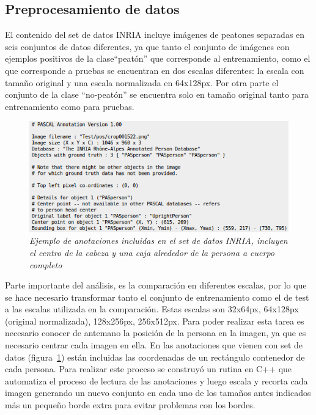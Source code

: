 \subsection{Preprocesamiento de datos}

El contenido del set de datos INRIA incluye imágenes de peatones separadas en seis conjuntos de datos diferentes, ya que tanto el conjunto de imágenes con ejemplos positivos de la clase``peatón'' que corresponde al entrenamiento, como el que corresponde a pruebas se encuentran en dos escalas diferentes: la escala con tamaño original y una escala normalizada en 64x128px. Por otra parte el conjunto de la clase ``no-peatón'' se encuentra solo en tamaño original tanto para entrenamiento como para pruebas. 

\begin{figure}[htc]
  \centering
  \includegraphics[scale=.6]{images/ejanotacion}
  \caption{\em Ejemplo de anotaciones incluidas en el set de datos INRIA, incluyen el centro de la cabeza y una caja alrededor de la persona a cuerpo completo }  
  \label{fig:ejanotacion}
\end{figure}

Parte importante del análisis, es la comparación en diferentes escalas, por lo que se hace necesario transformar tanto el conjunto de entrenamiento como el de test a las escalas utilizada en la comparación. Estas escalas son 32x64px, 64x128px (original normalizada), 128x256px, 256x512px. Para poder realizar esta tarea es necesario conocer de antemano la posición de la persona en la imagen, ya que es necesario centrar cada imagen en ella. En las anotaciones que vienen con set de datos (figura~\ref{fig:ejanotacion}) están incluidas las coordenadas de un rectángulo contenedor de cada persona. Para realizar este proceso se construyó un rutina en C++ que automatiza el proceso de lectura de las anotaciones y luego escala y recorta cada imagen generando un nuevo conjunto en cada uno de los tamaños antes indicados más un pequeño borde extra para evitar problemas con los bordes.

